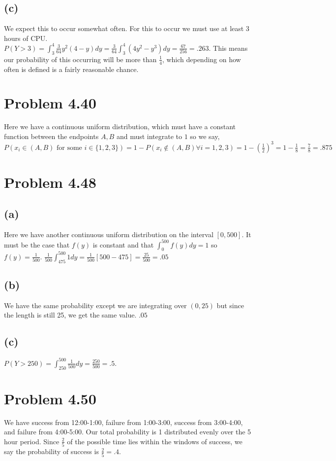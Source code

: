 \documentclass{article}
\theoremstyle{definition}
\begin{document}
    \subsection*{(c)}
        We expect this to occur somewhat often. For this to occur we must use at least 3 hours of CPU.
        $P(Y > 3) = \int_3^4 \frac{3}{64}y^2(4-y)dy = \frac{3}{64}\int_3^4(4y^2 - y^3)dy = \frac{67}{256} = .263$.
        This means our probability of this occurring will be more than $\frac{1}{4}$, which depending on how often is 
        defined is a fairly reasonable chance.
\section*{Problem 4.40}
    Here we have a continuous uniform distribution, which must have a constant function between the endpoints $A,B$ and must integrate to $1$ so we say,
    $P(x_i \in (A,B) \text{ for some } i \in \{1,2,3\}) = 1 - P(x_i \notin (A,B) \forall i = 1,2,3) = 1 - \left(\frac{1}{2}\right)^3 = 1 - \frac{1}{8} = \frac{7}{8} = .875$
\section*{Problem 4.48}
    \subsection*{(a)}
        Here we have another continuous uniform distribution on the interval $[0,500]$. It must be the case that
        $f(y)$ is constant and that $\int_0^{500}f(y)dy = 1$ so $f(y) = \frac{1}{500}$.
        $\frac{1}{500} \int_{475}^{500} 1 dy = \frac{1}{500}[500 - 475] = \frac{25}{500} = .05$
    \subsection*{(b)}
        We have the same probability except we are integrating over $(0, 25)$ but since the length is still 25, we get the same value.
        $.05$
    \subsection*{(c)}
        $P(Y > 250) = \int_{250}^{500} \frac{1}{500} dy = \frac{250}{500} = .5$.
\section*{Problem 4.50}
    We have success from 12:00-1:00, failure from 1:00-3:00, success from 3:00-4:00, and failure from 4:00-5:00. Our total probability is 1 distributed 
    evenly over the 5 hour period. Since $\frac{2}{5}$ of the possible time lies within the windows of success, we say the probability of success is
    $\frac{2}{5} = .4$.
\end{document}
